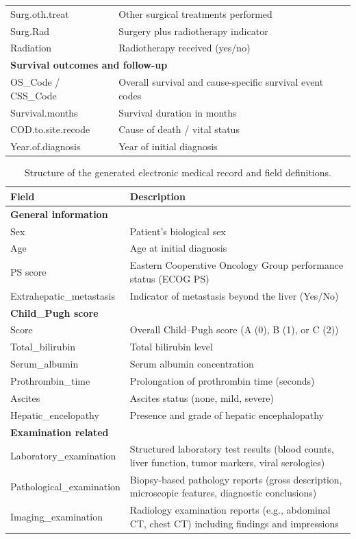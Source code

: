 \documentclass{article}
\begin{document}
\begin{table}[t]
\begin{tabular}{p{6cm} p{7.5cm}}
Surg.oth.treat & Other surgical treatments performed \\
Surg.Rad & Surgery plus radiotherapy indicator \\
Radiation & Radiotherapy received (yes/no) \\
\hline
\multicolumn{2}{l}{\textbf{Survival outcomes and follow-up}} \\
OS\_Code / CSS\_Code & Overall survival and cause-specific survival event codes \\
Survival.months & Survival duration in months \\
COD.to.site.recode & Cause of death / vital status \\
Year.of.diagnosis & Year of initial diagnosis \\
\bottomrule
\end{tabular}
\end{table}

\begin{table}[htbp]
\setlength{\tabcolsep}{3pt} %
\renewcommand{\arraystretch}{1.25}
\centering
\caption{Structure of the generated electronic medical record and field definitions.}
\label{tab:emr_fields_grouped}
\begin{tabular}{p{6cm} p{8cm}}
\hline
\textbf{Field} & \textbf{Description} \\
\hline
\multicolumn{2}{l}{\textbf{General information}} \\
Sex & Patient's biological sex \\
Age & Age at initial diagnosis \\
PS score & Eastern Cooperative Oncology Group performance status (ECOG PS) \\
Extrahepatic\_metastasis & Indicator of metastasis beyond the liver (Yes/No) \\
\hline
\multicolumn{2}{l}{\textbf{Child\_Pugh score}} \\
Score & Overall Child--Pugh score (A (0), B (1), or C (2)) \\
Total\_bilirubin & Total bilirubin level \\
Serum\_albumin & Serum albumin concentration \\
Prothrombin\_time & Prolongation of prothrombin time (seconds) \\
Ascites & Ascites status (none, mild, severe) \\
Hepatic\_encelopathy & Presence and grade of hepatic encephalopathy \\
\hline
\multicolumn{2}{l}{\textbf{Examination related}} \\
Laboratory\_examination & Structured laboratory test results (blood counts, liver function, tumor markers, viral serologies) \\
Pathological\_examination & Biopsy-based pathology reports (gross description, microscopic features, diagnostic conclusions) \\
Imaging\_examination & Radiology examination reports (e.g., abdominal CT, chest CT) including findings and impressions \\
\hline
\end{tabular}
\end{table}
\end{document}
